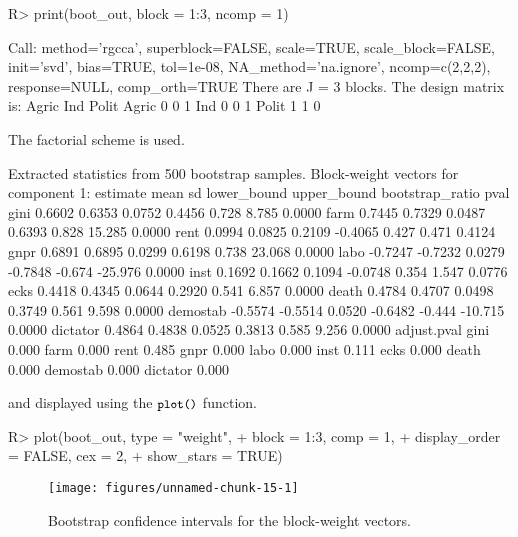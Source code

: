 \documentclass[
]{jss}
\begin{document}
\begin{CodeChunk}
\begin{CodeInput}
R> print(boot_out, block = 1:3, ncomp = 1)
\end{CodeInput}
\begin{CodeOutput}
Call: method='rgcca', superblock=FALSE, scale=TRUE, scale_block=FALSE, init='svd',
bias=TRUE, tol=1e-08, NA_method='na.ignore', ncomp=c(2,2,2), response=NULL,
comp_orth=TRUE 
There are J = 3 blocks.
The design matrix is:
      Agric Ind Polit
Agric     0   0     1
Ind       0   0     1
Polit     1   1     0

The factorial scheme is used.

Extracted statistics from 500 bootstrap samples.
Block-weight vectors for component 1: 
         estimate    mean     sd lower_bound upper_bound bootstrap_ratio   pval
gini       0.6602  0.6353 0.0752      0.4456       0.728           8.785 0.0000
farm       0.7445  0.7329 0.0487      0.6393       0.828          15.285 0.0000
rent       0.0994  0.0825 0.2109     -0.4065       0.427           0.471 0.4124
gnpr       0.6891  0.6895 0.0299      0.6198       0.738          23.068 0.0000
labo      -0.7247 -0.7232 0.0279     -0.7848      -0.674         -25.976 0.0000
inst       0.1692  0.1662 0.1094     -0.0748       0.354           1.547 0.0776
ecks       0.4418  0.4345 0.0644      0.2920       0.541           6.857 0.0000
death      0.4784  0.4707 0.0498      0.3749       0.561           9.598 0.0000
demostab  -0.5574 -0.5514 0.0520     -0.6482      -0.444         -10.715 0.0000
dictator   0.4864  0.4838 0.0525      0.3813       0.585           9.256 0.0000
         adjust.pval
gini           0.000
farm           0.000
rent           0.485
gnpr           0.000
labo           0.000
inst           0.111
ecks           0.000
death          0.000
demostab       0.000
dictator       0.000
\end{CodeOutput}
\end{CodeChunk}

\normalsize

and displayed using the \(\small{\texttt{plot()}}\) function.

\footnotesize

\begin{CodeChunk}
\begin{CodeInput}
R> plot(boot_out, type = "weight", 
+      block = 1:3, comp = 1, 
+      display_order = FALSE, cex = 2,
+      show_stars = TRUE)
\end{CodeInput}
\begin{figure}[H]

{\centering \texttt{[image: figures/unnamed-chunk-15-1]} 

}

\caption[Bootstrap confidence intervals for the block-weight vectors]{Bootstrap confidence intervals for the block-weight vectors.}\label{fig:unnamed-chunk-15}
\end{figure}
\end{CodeChunk}
\end{document}
